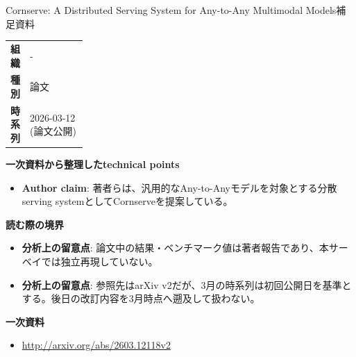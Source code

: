 \begin{technicalnote}{Cornserve: A Distributed Serving System for Any-to-Any Multimodal Models}{補足資料}
\begingroup
\begin{tabularx}{\linewidth}{@{}>{\bfseries}p{0.22\linewidth}X@{}}
組織 & - \\
種別 & 論文 \\
時系列 & 2026-03-12 (論文公開) \\
\end{tabularx}
\smallskip
{\bfseries 一次資料から整理したtechnical points}
\begin{itemize}[leftmargin=1.5em,itemsep=0.35em]
\item \textbf{Author claim}: 著者らは、汎用的なAny-to-Anyモデルを対象とする分散serving systemとしてCornserveを提案している。
\end{itemize}
\begin{minipage}{\linewidth}
{\bfseries 読む際の境界}
\begin{itemize}[leftmargin=1.5em,itemsep=0.35em]
\item \textbf{分析上の留意点}: 論文中の結果・ベンチマーク値は著者報告であり、本サーベイでは独立再現していない。
\item \textbf{分析上の留意点}: 参照先はarXiv v2だが、3月の時系列は初回公開日を基準とする。後日の改訂内容を3月時点へ遡及して扱わない。
\end{itemize}
\begin{samepage}
{\bfseries 一次資料}
\begingroup\sloppy
\begin{itemize}[leftmargin=1.5em,itemsep=0.25em]
\item {\scriptsize\url{http://arxiv.org/abs/2603.12118v2}}
\end{itemize}
\endgroup
\end{samepage}
\end{minipage}
\endgroup
\end{technicalnote}
\medskip

